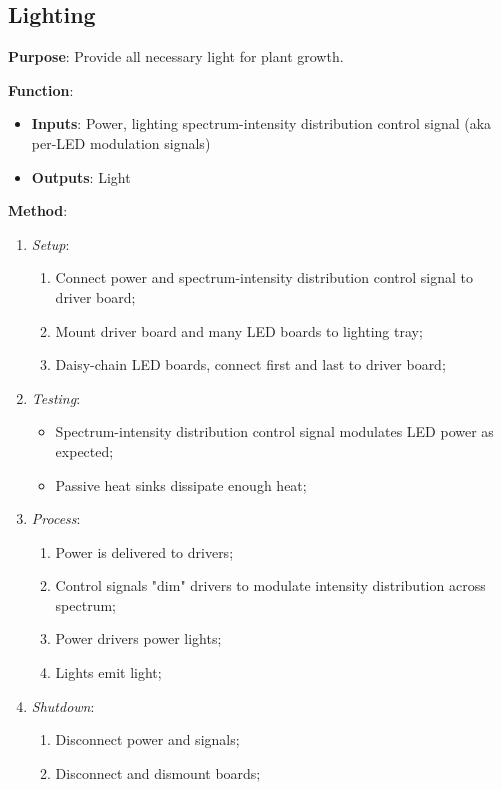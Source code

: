 \documentclass{../tex/report}
\begin{document}
\newpage

\subsection{Lighting}
\label{sec:lighting}

\textbf{Purpose}: Provide all necessary light for plant growth.

\textbf{Function}:
\begin{itemize}
    \item \textbf{Inputs}: Power, lighting spectrum-intensity distribution control signal (aka per-LED modulation signals)
    \item \textbf{Outputs}: Light
\end{itemize}

\textbf{Method}:
\begin{enumerate}
    \item \textit{Setup}:
    \begin{enumerate}
        \item Connect power and spectrum-intensity distribution control signal to driver board;
        \item Mount driver board and many LED boards to lighting tray;
        \item Daisy-chain LED boards, connect first and last to driver board;
    \end{enumerate}
    \item \textit{Testing}:
    \begin{itemize}
        \item Spectrum-intensity distribution control signal modulates LED power as expected;
        \item Passive heat sinks dissipate enough heat;
    \end{itemize}
    \item \textit{Process}:
    \begin{enumerate}
        \item Power is delivered to drivers;
        \item Control signals "dim" drivers to modulate intensity distribution across spectrum;
        \item Power drivers power lights;
        \item Lights emit light;
    \end{enumerate}
    \item \textit{Shutdown}:
    \begin{enumerate}
        \item Disconnect power and signals;
        \item Disconnect and dismount boards;
    \end{enumerate}
\end{enumerate}
\end{document}
